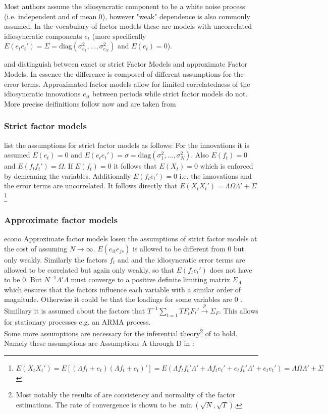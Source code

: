 \documentclass[12pt]{article}
\begin{document}
Most authors assume the idiosyncratic component to be a white noise process (i.e. independent and of mean 0), however "weak" dependence is also commonly assumed. In the vocabulary of factor models these are models with uncorrelated idiosyncratic components $e_t$ (more specifically $E(e_t e_t') = \Sigma = \text{diag}(\sigma_{e_1}^2, ..., \sigma_{e_N}^2)$ and $E(e_t) = 0$).

\citet{geweke1977dynamic} and \citet{sargent1977business} distinguish between exact or strict Factor Models and approximate Factor Models. In essence the difference is composed of different assumptions for the error terms. Approximated factor models allow for limited correlatedness of the idiosyncratic innovations $e_{it}$ between periods while strict factor models do not. More precise deifinitions follow now and are taken from \citet{breitung2006dynamic}
\subsubsection*{Strict factor models}
\citet{breitung2006dynamic} list the assumptions for strict factor models as follows: For the innovations it is assumed $E(e_t) = 0$ and $E(e_te_t') = \sigma = \text{diag}(\sigma_1^2, ..., \sigma_N^2)$. Also $E(f_t) = 0$ and $E(f_tf_t') = \Omega$. If $E(f_t) = 0$ it follows that $E(X_t) = 0$ which is enforced by demeaning the variables. Additionally $E(f_t e_t') = 0$ i.e. the innovations and the error terms are uncorrelated. It follows directly that $E(X_tX_t') = \Lambda \Omega \Lambda' + \Sigma$\footnote{$E(X_tX_t') = E[(\Lambda f_t +e_t) (\Lambda f_t + e_t)'] = E(\Lambda f_t f_t' \Lambda' + \Lambda f_t e_t' + e_t f_t' \Lambda' + e_t e_t') = \Lambda \Omega \Lambda' + \Sigma$}
\subsubsection*{Approximate factor models}econo
Approximate factor models losen the assumptions of strict factor models at the cost of assuming $N \to \infty$.
$E(e_{it}e_{js})$ is allowed to be different from $0$ but only weakly. Similarly the factors $f_t$ and and the idiosyncratic error terms are allowed to be correlated but again only weakly, so that $E(f_t e_t')$ does not have to be $0$. But $N^{-1}\Lambda'\Lambda$ must converge to a positive definite limiting matrix $\Sigma_\Lambda$ which ensures that the factors influence each variable with a similar order of magnitude. Otherwise it could be that the loadings for some variables are $0$ \citep{breitung2006dynamic}. Similiary it is assumed about the factors that $T^{-1}\sum_{t=1}TF_tF_t' \overset{p}{\to} \Sigma_F$. This allows for stationary processes e.g. an ARMA process. \\
Some more assumptions are necessary for the inferential theory\footnote{Most notably the results of \citet{bai2003inferential} are consistency and normality of the factor estimations. The rate of convergence is shown to be $\min(\sqrt{N}, \sqrt{T})$.} of \citet{bai2003inferential} to hold. Namely these assumptions are Assumptions A through D in \citet{bai2003inferential}:
\end{document}
